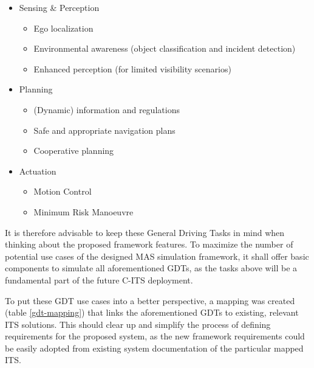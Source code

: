 \documentclass[0main.tex]{subfiles}
\begin{document}
\begin{itemize}
    \item Sensing \& Perception
    \begin{itemize}
        \item Ego localization
        \item Environmental awareness (object classification and incident detection)
        \item Enhanced perception (for limited visibility scenarios)
    \end{itemize}
    \item Planning
    \begin{itemize}
        \item (Dynamic) information and regulations
        \item Safe and appropriate navigation plans
        \item Cooperative planning
    \end{itemize}
    \item Actuation
    \begin{itemize}
        \item Motion Control
        \item Minimum Risk Manoeuvre
    \end{itemize}
\end{itemize}

It is therefore advisable to keep these General Driving Tasks in mind when thinking about the proposed framework 
features. To maximize the number of potential use cases of the designed MAS simulation framework, 
it shall offer basic components to simulate all aforementioned GDTs, as the tasks above will be
a fundamental part of the future C-ITS deployment.

To put these GDT use cases into a better perspective, a mapping was created (table
\ref{gdt-mapping}) that links the aforementioned GDTs to existing, relevant ITS solutions.
This should clear up and simplify the process of defining requirements for the proposed system,
as the new framework requirements could be easily adopted from existing system documentation of
the particular mapped ITS.
\end{document}
